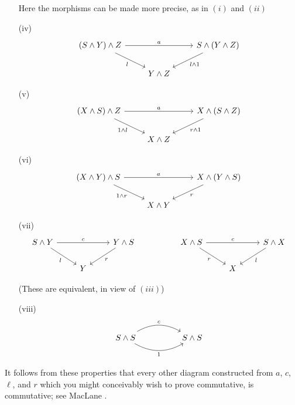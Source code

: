 \documentclass[../main]{subfiles}
\begin{document}
\begin{enumerate}
    Here the morphisms can be made more precise, as in $(i)$ and $(ii)$
    \item[(iv)] \[\begin{tikzcd}
	{(S\wedge Y)\wedge Z} && {S\wedge(Y\wedge Z)} \\
	& {Y\wedge Z}
	\arrow["a", from=1-1, to=1-3]
	\arrow["l"', from=1-1, to=2-2]
	\arrow["l\wedge 1", from=1-3, to=2-2]
    \end{tikzcd}\]
    \item[(v)]\[\begin{tikzcd}
	{(X\wedge S)\wedge Z} && {X\wedge(S\wedge Z)} \\
	& {X\wedge Z}
	\arrow["a", from=1-1, to=1-3]
	\arrow["1\wedge l"', from=1-1, to=2-2]
	\arrow["r\wedge 1", from=1-3, to=2-2]
    \end{tikzcd}\]
    \item[(vi)]\[\begin{tikzcd}
	{(X\wedge Y)\wedge S} && {X\wedge(Y\wedge S)} \\
	& {X\wedge Y}
	\arrow["a", from=1-1, to=1-3]
	\arrow["1\wedge r"', from=1-1, to=2-2]
	\arrow["r", from=1-3, to=2-2]
    \end{tikzcd}\]
    \item[(vii)]\[\begin{tikzcd}
	{S\wedge Y} && {Y\wedge S} && {X\wedge S} && {S\wedge X} \\
	& Y &&&& X
	\arrow["c", from=1-1, to=1-3]
	\arrow["l"', from=1-1, to=2-2]
	\arrow["r", from=1-3, to=2-2]
	\arrow["c", from=1-5, to=1-7]
	\arrow["r"', from=1-5, to=2-6]
	\arrow["l", from=1-7, to=2-6]
    \end{tikzcd}\]
    
    (These are equivalent, in view of $(iii)$)
    \item[(viii)] \[\begin{tikzcd}
	{S\wedge S} && {S\wedge S}
	\arrow["c", bend left=30, from=1-1, to=1-3]
	\arrow["1"', bend right=30, from=1-1, to=1-3]
    \end{tikzcd}\]
\end{enumerate}



It follows from these properties that every other diagram constructed from $a$, $c$, $\ell$, and $r$ which you might conceivably wish to prove commutative, is commutative; see MacLane \plscite{[8]}.
\end{document}
